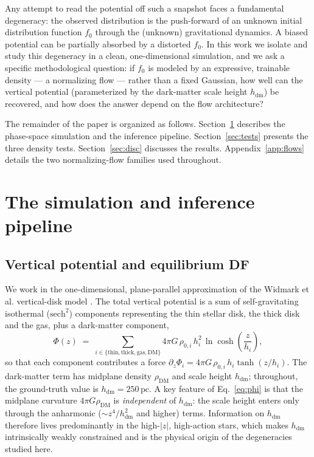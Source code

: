 \documentclass[11pt]{article}
\newcommand{\hdm}{h_{\mathrm{dm}}}
\newcommand{\pc}{\,\mathrm{pc}}
\newcommand{\ffo}{f_{0}}
\begin{document}
Any attempt to read the potential off such a snapshot faces a fundamental
degeneracy: the observed distribution is the push-forward of an unknown
initial distribution function $\ffo$ through the (unknown) gravitational
dynamics. A biased potential can be partially absorbed by a distorted
$\ffo$. In this work we isolate and study this degeneracy in a clean,
one-dimensional simulation, and we ask a specific methodological question:
if $\ffo$ is modeled by an expressive, trainable density --- a normalizing
flow \cite{rezende2015,dinh2017,papamakarios2021} --- rather than a fixed
Gaussian, how well can the vertical potential (parameterized by the
dark-matter scale height $\hdm$) be recovered, and how does the answer
depend on the flow architecture?

The remainder of the paper is organized as follows.
Section~\ref{sec:sim} describes the phase-space simulation and the
inference pipeline. Section~\ref{sec:tests} presents the three density
tests. Section~\ref{sec:disc} discusses the results.
Appendix~\ref{app:flows} details the two normalizing-flow families used
throughout.

\section{The simulation and inference pipeline}
\label{sec:sim}

\subsection{Vertical potential and equilibrium DF}

We work in the one-dimensional, plane-parallel approximation of the
Widmark et al. vertical-disk model \cite{widmark2021}. The total vertical
potential is a sum of self-gravitating isothermal ($\mathrm{sech}^{2}$)
components representing the thin stellar disk, the thick disk and the gas,
plus a dark-matter component,
%
\begin{equation}
\Phi(z) \;=\; \sum_{i \in \{\mathrm{thin,thick,gas,DM}\}}
4\pi G\,\rho_{0,i}\, h_{i}^{2}\,
\ln\!\cosh\!\left(\frac{z}{h_{i}}\right),
\label{eq:phi}
\end{equation}
%
so that each component contributes a force
$\partial_z\Phi_i = 4\pi G\,\rho_{0,i}\,h_{i}\tanh(z/h_i)$. The dark-matter
term has midplane density $\rho_{\mathrm{DM}}$ and scale height $\hdm$;
throughout, the ground-truth value is $\hdm = 250\pc$. A key feature of
Eq.~\eqref{eq:phi} is that the midplane curvature $4\pi G\rho_{\mathrm{DM}}$
is \emph{independent} of $\hdm$: the scale height enters only through the
anharmonic ($\sim z^{4}/\hdm^{2}$ and higher) terms. Information on $\hdm$
therefore lives predominantly in the high-$|z|$, high-action stars, which
makes $\hdm$ intrinsically weakly constrained and is the physical origin of
the degeneracies studied here.
\end{document}
